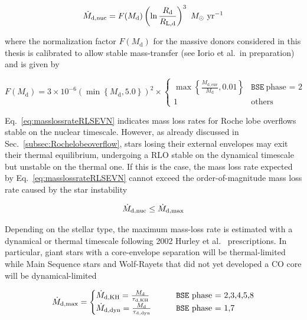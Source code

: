 \documentclass[a4paper,titlepage]{book}     	%
\newcommand{\sun}{\ensuremath{_\odot}}
\newcommand{\mdot}{\ensuremath{\dot{M}}}
\newcommand{\msun}{\ensuremath{M\sun}}
\newcommand{\yr}{\text{yr}}
\begin{document}
\begin{equation}\label{eq:masslossrateRLSEVN}
\mdot_{\rm d, nuc} = F(M_\mathrm{d}) \left( \ln \frac{R_\mathrm{d}}{R_\mathrm{L,d}} \right)^3~\msun~\yr^{-1} 
\end{equation}


where the normalization factor $F(M_\mathrm{d})$ for the massive donors considered in this thesis is calibrated to allow stable mass-transfer (see Iorio et al.\ in preparation) and is given by

\begin{equation*}
F(M_\mathrm{d}) =  3 \times 10^{-6} \left( \min \left\{ M_\mathrm{d}, 5.0 \right\} \right)^2 \times
\begin{cases}
\max \left\{ \frac{M_\mathrm{d, env}}{M_\mathrm{d}} ,0.01 \right\} & \texttt{BSE} ~\text{phase = 2} \\
1 & \text{others}
\end{cases}
\end{equation*}

Eq.\ \ref{eq:masslossrateRLSEVN} indicates mass loss rates for Roche lobe overflows stable on the nuclear timescale. However, as already discussed in Sec.\ \ref{subsec:Rochelobeoverflow}, stars losing their external envelopes may exit their thermal equilibrium, undergoing a RLO stable on the dynamical timescale but unstable on the thermal one. If this is the case, the mass loss rate expected by Eq.\ \ref{eq:masslossrateRLSEVN} cannot exceed the order-of-magnitude mass loss rate caused by the star instability

\begin{equation}
    \mdot_{\rm d, nuc} \leq \mdot_{\rm d, max}
\end{equation}

Depending on the stellar type, the maximum mass-loss rate is estimated with a dynamical or thermal timescale following 2002 Hurley et al.\ \cite{Hurley2002} prescriptions. In particular, giant stars with a core-envelope separation will be thermal-limited while Main Sequence stars and Wolf-Rayets that did not yet developed a CO core will be dynamical-limited

\begin{equation}
    \mdot_{\rm d, max} = 
    \begin{cases}
        \mdot_{\rm d, KH} = \frac{M_{\rm d}}{\tau_{\rm d, KH}}   & \qquad \texttt{BSE} ~\text{phase = 2,3,4,5,8} \\
        \mdot_{\rm d, dyn} = \frac{M_{\rm d}}{\tau_{\rm d, dyn}} & \qquad \texttt{BSE}~\text{phase = 1,7}
    \end{cases}
\end{equation}
\end{document}
